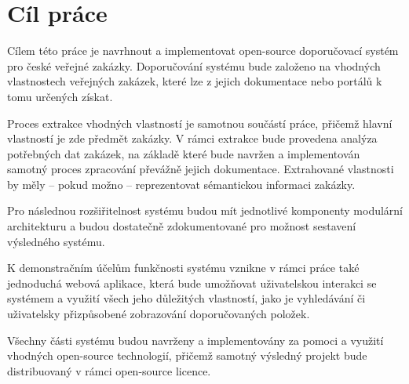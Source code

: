 \documentclass[thesis=M,czech]{FITthesis}[2019/12/23]
\begin{document}
\begin{introduction}
    
    
\end{introduction}

\chapter{Cíl práce}

Cílem této práce je navrhnout a implementovat open-source doporučovací systém pro české veřejné zakázky. Doporučování systému bude založeno na vhodných vlastnostech veřejných zakázek, které lze z jejich dokumentace nebo portálů k tomu určených získat.

Proces extrakce vhodných vlastností je samotnou součástí práce, přičemž hlavní vlastností je zde předmět zakázky. V rámci extrakce bude provedena analýza potřebných dat zakázek, na základě které bude navržen a implementován samotný proces zpracování převážně jejich dokumentace. Extrahované vlastnosti by měly -- pokud možno -- reprezentovat sémantickou informaci zakázky.

Pro následnou rozšiřitelnost systému budou mít jednotlivé komponenty modulární architekturu a budou dostatečně zdokumentované pro možnost sestavení výsledného systému.

K demonstračním účelům funkčnosti systému vznikne v rámci práce také jednoduchá webová aplikace, která bude umožňovat uživatelskou interakci se systémem a využití všech jeho důležitých vlastností, jako je vyhledávání či uživatelsky přizpůsobené zobrazování doporučovaných položek.

Všechny části systému budou navrženy a implementovány za pomoci a využití vhodných open-source technologií, přičemž samotný výsledný projekt bude distribuovaný v rámci open-source licence.

    
\end{document}
